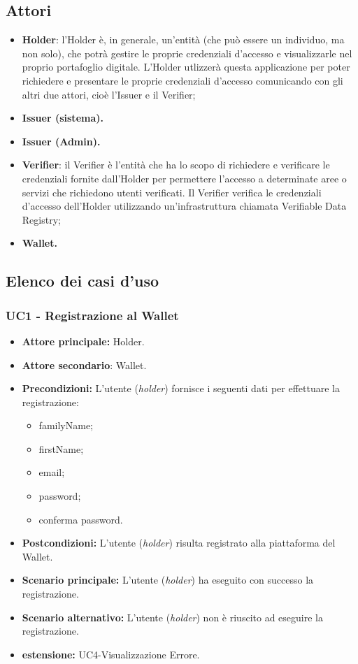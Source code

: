 \subsection{Attori}
\begin{itemize}
    \item\textbf{Holder}: l’Holder è, in generale, un’entità (che può essere un individuo, ma non solo), che potrà gestire le proprie credenziali d’accesso e visualizzarle nel proprio portafoglio digitale. L’Holder utlizzerà questa applicazione per poter richiedere e presentare le proprie credenziali d’accesso comunicando con gli altri due attori, cioè l’Issuer e il Verifier;
    \item\textbf{Issuer (sistema).}
    \item\textbf{Issuer (Admin).}
    \item\textbf{Verifier}: il Verifier è l’entità che ha lo scopo di richiedere e verificare le credenziali fornite dall’Holder per permettere l’accesso a determinate aree o servizi che richiedono utenti verificati. Il Verifier verifica le credenziali d’accesso dell’Holder utilizzando un’infrastruttura chiamata Verifiable Data Registry;
    \item\textbf{Wallet.}
\end{itemize}

\subsection{Elenco dei casi d'uso}
\subsubsection{UC1 - Registrazione al Wallet}
\begin{itemize}
\item \textbf{Attore principale:} Holder.
\item \textbf{Attore secondario}: Wallet. 
\item \textbf{Precondizioni:} L’utente (\textit{holder}) fornisce i seguenti dati per effettuare la registrazione:
\begin{itemize}
    \item familyName;
    \item firstName;
    \item email;
    \item password;
    \item conferma password.
\end{itemize}
\item \textbf{Postcondizioni:} L’utente (\textit{holder}) risulta registrato alla piattaforma del Wallet.
\item \textbf{Scenario principale:} L'utente (\textit{holder}) ha eseguito con successo la registrazione.
\item \textbf{Scenario alternativo:} L'utente (\textit{holder}) non è riuscito ad eseguire la registrazione.
\item \textbf{estensione:} UC4-Visualizzazione Errore.
\end{itemize}

